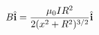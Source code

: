 \documentclass[preview]{standalone}
\begin{document}
\begin{align*}
B \hat{\mathbf{i}}  =  {{\mu_0 I R^2 } \over  {2 {(x^2 + R^2)^{3/2}}}} \hat{\mathbf{i}}
\end{align*}
\end{document}
